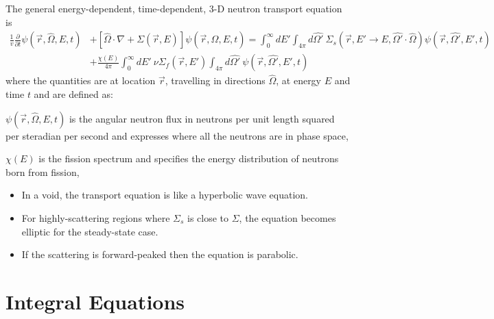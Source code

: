 \documentclass[12pt]{article}
\newcommand{\Macro}{\ensuremath{\Sigma}}
\begin{document}
The general energy-dependent, time-dependent, 3-D neutron transport equation is 
\begin{align}
\frac{1}{v} \frac{\partial}{\partial t}\psi(\vec{r}, \hat{\Omega}, E, t) &+ [\hat{\Omega} \cdot \nabla + \Macro(\vec{r}, E)] \psi(\vec{r}, \hat{\Omega}, E, t)  =  \int_0^{\infty} dE' \int_{4\pi} d\hat{\Omega'} \:\Macro_{s}(\vec{r}, E' \to E, \hat{\Omega'} \cdot \hat{\Omega}) \psi(\vec{r}, \hat{\Omega'}, E', t) \nonumber \\
&+\frac{ \chi(E)}{4 \pi} \int_0^{\infty} dE' \:\nu \Macro_{f}(\vec{r}, E') \int_{4\pi} d\hat{\Omega'} \:\psi(\vec{r}, \hat{\Omega'}, E', t) \nonumber
\end{align}
%
\noindent where the quantities are at location $\vec{r}$, travelling in directions $\hat{\Omega}$, at energy $E$ and time $t$ and are defined as:
\begin{list}{}{\hspace{2em}}
  \item $\psi(\vec{r}, \hat{\Omega}, E, t)$ is the angular neutron flux in neutrons per unit length squared per steradian per second and expresses where all the neutrons are in phase space, 
  \item $\chi(E)$ is the fission spectrum and specifies the energy distribution of neutrons born from fission,
\end{list}

\begin{itemize}
\item In a void, the transport equation is like a hyperbolic wave equation. 
\item For highly-scattering regions where $\Macro_{s}$ is close to $\Macro$, the equation becomes elliptic for the steady-state case. 
\item If the scattering is forward-peaked then the equation is parabolic.
\end{itemize}


\section{Integral Equations}
\end{document}
